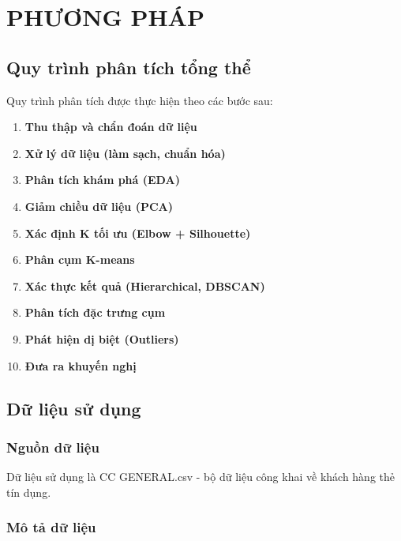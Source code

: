 \chapter{PHƯƠNG PHÁP}

\section{Quy trình phân tích tổng thể}

Quy trình phân tích được thực hiện theo các bước sau:

\begin{enumerate}
    \item \textbf{Thu thập và chẩn đoán dữ liệu}
    \item \textbf{Xử lý dữ liệu (làm sạch, chuẩn hóa)}
    \item \textbf{Phân tích khám phá (EDA)}
    \item \textbf{Giảm chiều dữ liệu (PCA)}
    \item \textbf{Xác định K tối ưu (Elbow + Silhouette)}
    \item \textbf{Phân cụm K-means}
    \item \textbf{Xác thực kết quả (Hierarchical, DBSCAN)}
    \item \textbf{Phân tích đặc trưng cụm}
    \item \textbf{Phát hiện dị biệt (Outliers)}
    \item \textbf{Đưa ra khuyến nghị}
\end{enumerate}

\section{Dữ liệu sử dụng}

\subsection{Nguồn dữ liệu}

Dữ liệu sử dụng là CC GENERAL.csv - bộ dữ liệu công khai về khách hàng thẻ tín dụng.

\subsection{Mô tả dữ liệu}

